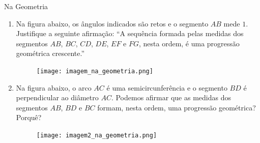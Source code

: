\begin{task}{Na Geometria}

\begin{enumerate}

\item{}
Na figura abaixo, os ângulos indicados são retos e o segmento $AB$ mede $1$. Justifique a seguinte afirmação: “A sequência formada pelas medidas dos segmentos $AB$, $BC$, $CD$, $DE$, $EF$ e $FG$, nesta ordem, é uma progressão geométrica crescente.”

\begin{figure}[H]
\centering
\texttt{[image: imagem\_na\_geometria.png]}
\end{figure}

\item{}
Na figura abaixo, o arco $AC$ é uma semicircunferência e o segmento $BD$ é perpendicular ao diâmetro $AC$. Podemos afirmar que as medidas dos segmentos $AB$, $BD$ e $BC$ formam, nesta ordem, uma progressão geométrica? Porquê?

\begin{figure}[H]
\centering
\texttt{[image: imagem2\_na\_geometria.png]}
\end{figure}

\end{enumerate}

\end{task}


